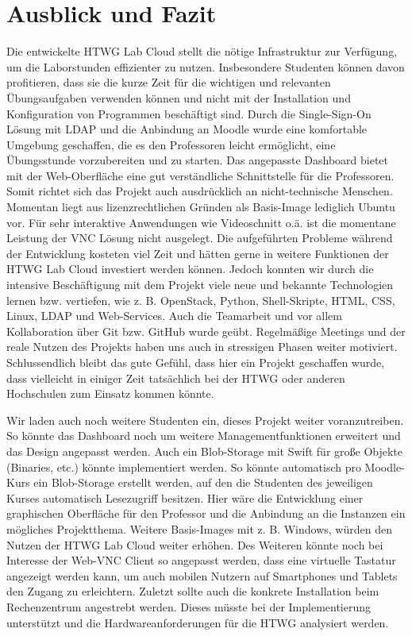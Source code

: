 \chapter{Ausblick und Fazit}

Die entwickelte HTWG Lab Cloud stellt die nötige Infrastruktur zur Verfügung, um die Laborstunden effizienter zu nutzen.
Insbesondere Studenten können davon profitieren, dass sie die kurze Zeit für die wichtigen und relevanten Übungsaufgaben verwenden können und nicht mit der Installation und Konfiguration von Programmen beschäftigt sind.
Durch die Single-Sign-On Lösung mit LDAP und die Anbindung an Moodle wurde eine komfortable Umgebung geschaffen, die es den Professoren leicht ermöglicht, eine Übungsstunde vorzubereiten und zu starten.
Das angepasste Dashboard bietet mit der Web-Oberfläche eine gut verständliche Schnittstelle für die Professoren. 
Somit richtet sich das Projekt auch ausdrücklich an nicht-technische Menschen.
Momentan liegt aus lizenzrechtlichen Gründen als Basis-Image lediglich Ubuntu vor. 
Für sehr interaktive Anwendungen wie Videoschnitt o.ä. ist die momentane Leistung der VNC Lösung nicht ausgelegt. 
Die aufgeführten Probleme während der Entwicklung kosteten viel Zeit und hätten gerne in weitere Funktionen der HTWG Lab Cloud investiert werden können.
Jedoch konnten wir durch die intensive Beschäftigung mit dem Projekt viele neue und bekannte Technologien lernen bzw. vertiefen, wie z. B. OpenStack, Python, Shell-Skripte, HTML, CSS, Linux, LDAP und Web-Services.
Auch die Teamarbeit und vor allem Kollaboration über Git bzw. GitHub wurde geübt. 
Regelmäßige Meetings und der reale Nutzen des Projekts haben uns auch in stressigen Phasen weiter motiviert.
Schlussendlich bleibt das gute Gefühl, dass hier ein Projekt geschaffen wurde, dass vielleicht in einiger Zeit tatsächlich bei der HTWG oder anderen Hochschulen zum Einsatz kommen könnte.

Wir laden auch noch weitere Studenten ein, dieses Projekt weiter voranzutreiben. 
So könnte das Dashboard noch um weitere Managementfunktionen erweitert und das Design angepasst werden.
Auch ein Blob-Storage mit Swift für große Objekte (Binaries, etc.) könnte implementiert werden.
So könnte automatisch pro Moodle-Kurs ein Blob-Storage erstellt werden, auf den die Studenten des jeweiligen Kurses automatisch Lesezugriff besitzen.
Hier wäre die Entwicklung einer graphischen Oberfläche für den Professor und die Anbindung an die Instanzen ein mögliches Projektthema.
Weitere Basis-Images mit z. B. Windows, würden den Nutzen der HTWG Lab Cloud weiter erhöhen.
Des Weiteren könnte noch bei Interesse der Web-VNC Client so angepasst werden, dass eine virtuelle Tastatur angezeigt werden kann, um auch mobilen Nutzern auf Smartphones und Tablets den Zugang zu erleichtern.
Zuletzt sollte auch die konkrete Installation beim Rechenzentrum angestrebt werden.
Dieses müsste bei der Implementierung unterstützt und die Hardwareanforderungen für die HTWG analysiert werden.

